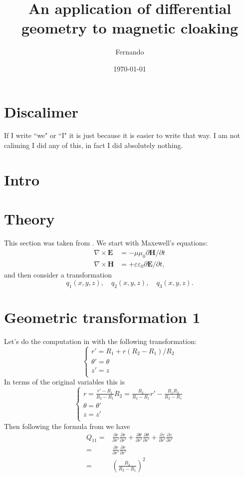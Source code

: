 \documentclass{amsart}
\begin{document}
\newcommand{\R}{\mathbb{R}}

\title{An application of differential geometry to magnetic cloaking}
\author{Fernando}
\date{\today}
\maketitle

\section{Discalimer}
If I write ``we" or ``I" it is just
because it is easier to write that way. I am not caliming
I did any of this, in fact I did absolutely nothing.
\section{Intro}
\blindtext[1]
\section{Theory}
This section was taken from \cite{ward96}.
We start with Maxewell's equations:
\begin{align*}
  \nabla \times \textbf{E} &= -\mu \mu_0 \partial \textbf{H} /\partial t\\
  \nabla \times \textbf{H} &= +\varepsilon \varepsilon_0 \partial \textbf{E} /\partial t,
\end{align*}
and then consider a transformation
\[
q_1(x,y,z), \quad q_2(x,y,z), \quad q_3(x,y,z).
\]
\section{Geometric transformation 1}
Let's do the computation in \cite{ward96} with the following transformation:
\[\begin{cases}
r'=R_1+r(R_2-R_1)/R_2\\
\theta'=\theta\\
z'=z\\
\end{cases}\]
In terms of the original variables this is
\[\begin{cases}
r=\frac{r'-R_1}{R_2-R_1}R_2=\frac{R_2}{R_2-R_1}r'-\frac{R_1R_2}{R_2-R_1}\\
\theta=\theta'\\
z=z'\\
\end{cases}\]
Then following the formula from \cite{ward96} we have
\begin{align*}
Q_{11}
=&\frac{\partial r}{\partial r'}\frac{\partial r}{\partial r'}
+\frac{\partial \theta}{\partial r'}\frac{\partial \theta}{\partial r'}
+\frac{\partial z}{\partial r'}\frac{\partial z}{\partial r'}\\
=&\frac{\partial r}{\partial r'}\frac{\partial r}{\partial r'}\\
=&\left(\frac{R_2}{R_2-R_1}\right)^2
\end{align*}
\end{document}
